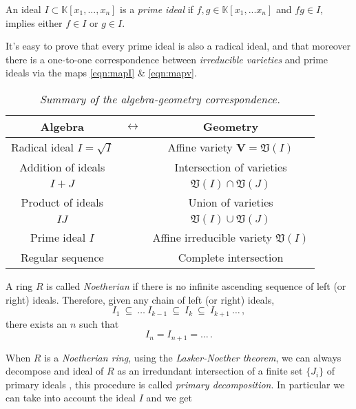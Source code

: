 \documentclass[main.tex]{subfiles}
\begin{document}
\begin{definition}
An ideal $I \subset \mathbb{K}[x_1,...,x_n]$ is a \textit{prime ideal} if $f,g \in \mathbb{K}[x_1,...x_n]$ and $fg \in I$, implies either $f \in I$ or $g \in I$.
\end{definition} 
It's easy to prove that every prime ideal is also a radical ideal, and that moreover there is a one-to-one correspondence between \textit{irreducible varieties} and prime ideals via the maps \eqref{eqn:mapI} \& \eqref{eqn:mapv}\cite{Cox:2007}.
\begin{table}
\centering
\begin{tabular}{ccc}
Algebra & $\leftrightarrow$ & Geometry\\
\hline
Radical ideal $I=\sqrt{I}$ &  & Affine variety $\mathbf{V}=\mathfrak{V}(I)$\\
\hline
Addition of ideals &  & Intersection of varieties\\
$I+J$             &   & $\mathfrak{V}(I) \cap \mathfrak{V}(J)$ \\

\hline
Product of ideals &  & Union of varieties\\
$IJ$             &   & $\mathfrak{V}(I) \cup \mathfrak{V}(J)$ \\

\hline
Prime ideal $I$ &  & Affine irreducible variety $\mathfrak{V}(I)$\\
\hline
Regular sequence & & Complete intersection\\
\hline
\end{tabular}
\caption{\textit{Summary of the algebra-geometry correspondence.} \label{tab:ag}}
\end{table}
\begin{definition}
A ring $R$ is called \textit{Noetherian} if there is no infinite ascending sequence of left (or right) ideals. Therefore, given any chain of left (or right) ideals,
\begin{equation}
I_1 \ \subseteq \ \dotsc \ I_{k-1} \ \subseteq \ I_{k} \ \subseteq \ I_{k+1} \ \dots \, ,
\end{equation}
there exists an $n$ such that
\begin{equation}
I_n = I_{n+1} = \dots\,.
\end{equation}
\end{definition}
When $R$ is a \textit{Noetherian ring}, using the \textit{Lasker-Noether theorem}, we can always decompose and ideal of $R$ as an irredundant intersection of a finite set $\{J_i\}$ of primary ideals \cite{Cox:2007}, this procedure is called \textit{primary decomposition}. In particular we can take into account the ideal $I$ and we get
\end{document}
